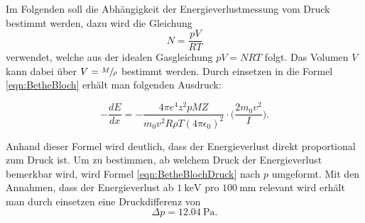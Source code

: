 Im Folgenden soll die Abhängigkeit der Energieverlustmessung vom Druck bestimmt werden, dazu
wird die Gleichung
\begin{equation}
N=\frac{pV}{RT}
\end{equation}
verwendet, welche aus der idealen Gasgleichung $pV=NRT$ folgt. Das Volumen $V$ kann
dabei über $V=\sfrac{M}{\rho}$ bestimmt werden. Durch einsetzen in die Formel \ref{eqn:BetheBloch}
erhält man folgenden Ausdruck:

\begin{equation}
  -\frac{dE}{dx}=-\frac{4\pi e^4 z^2 p MZ}{m_0 v^2 R\rho T (4\pi\epsilon_0)^2}\cdot\Big(\frac{2m_0v^2}{I}).
  \label{eqn:BetheBlochDruck}
\end{equation}

Anhand dieser Formel wird deutlich, dass der Energieverlust direkt proportional zum
Druck ist. Um zu bestimmen, ab welchem Druck der Energieverlust bemerkbar wird, wird
Formel \ref{eqn:BetheBlochDruck} nach $p$ umgeformt. Mit den Annahmen, dass der Energieverlust
ab $\SI{1}{\kilo\eV}$ pro $\SI{100}{\mm}$ relevant wird erhält man durch einsetzen eine
Druckdifferenz von
\begin{equation}
  \Delta p=\SI{12,04}{\Pa}.
\end{equation}
